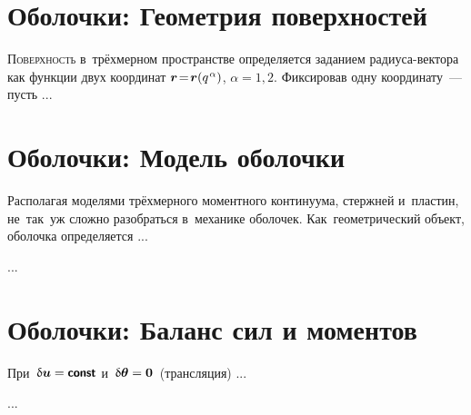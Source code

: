

\thispagestyle{empty}

\label{chapter:shellsandplates}

\begin{otherlanguage}{russian}

\section{Оболочки: Геометрия поверхностей}

\lettrine[lines=2, findent=2pt, nindent=0pt]{П}{оверхность} в~трёхмерном пространстве определяется заданием радиуса\hbox{-}вектора как функции двух координат ${\bm{r} \!=\! \bm{r}(q^{\hspace{.16ex}\alpha})}$, ${\alpha = 1, 2}$. Фиксировав одну координату~--- пусть ...




\section{Оболочки: Модель оболочки}

Располагая моделями трёхмерного моментного континуума, стержней и~пластин, не~так~уж сложно разобраться в~механике оболочек. Как~геометрический объект, оболочка определяется ...

...




\section{Оболочки: Баланс сил и моментов}

При~${\variation{\bm{u}} = \boldconst}$ и~${\updelta\hspace{-0.1ex}\bm{\theta} = \bm{0}}$~(трансляция) ...

...






\end{otherlanguage}
